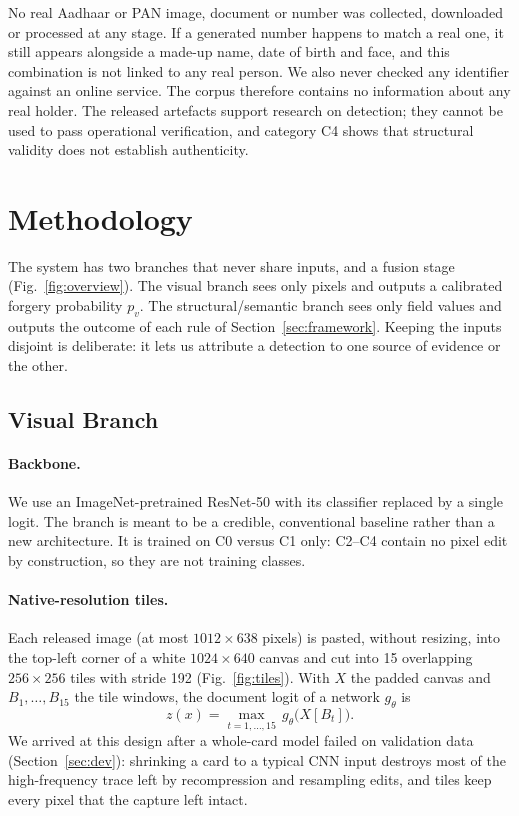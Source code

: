 \documentclass[VANCOUVER,Times1COL]{WileyNJDv5}
\begin{document}
No real Aadhaar or PAN image, document or number was collected,
downloaded or processed at any stage. If a generated number happens to match a real one, it still appears alongside a made-up name, date of birth and face, and this combination is not linked to any real person. We also never checked any identifier against an online service. The corpus therefore
contains no information about any real holder. The released artefacts
support research on detection; they cannot be used to pass operational
verification, and category C4 shows that structural validity does not
establish authenticity.

\section{Methodology}
\label{sec:method}

The system has two branches that never share inputs, and a fusion stage
(Fig.~\ref{fig:overview}). The visual branch sees only pixels and
outputs a calibrated forgery probability $p_v$. The
structural/semantic branch sees only field values and outputs the
outcome of each rule of Section~\ref{sec:framework}. Keeping the inputs
disjoint is deliberate: it lets us attribute a detection to one
source of evidence or the other.

\subsection{Visual Branch}
\label{sec:visual}

\paragraph*{Backbone.} We use an ImageNet-pretrained\cite{imagenet}
ResNet-50\cite{resnet} with its classifier replaced by a single logit.
The branch is meant to be a credible, conventional baseline rather than
a new architecture. It is trained on C0 versus C1 only: C2--C4 contain
no pixel edit by construction, so they are not training classes.

\paragraph*{Native-resolution tiles.} Each released image (at most
$1012{\times}638$ pixels) is pasted, without resizing, into the top-left
corner of a white $1024{\times}640$ canvas and cut into 15 overlapping
$256{\times}256$ tiles with stride 192 (Fig.~\ref{fig:tiles}). With
$X$ the padded canvas and $B_1,\dots,B_{15}$ the tile windows, the
document logit of a network $g_\theta$ is
\begin{equation}
\label{eq:maxtile}
z(x)=\max_{t=1,\dots,15}\, g_\theta\big(X[B_t]\big).
\end{equation}
We arrived at this design
after a whole-card model failed on validation data
(Section~\ref{sec:dev}): shrinking a card to a typical CNN input
destroys most of the high-frequency trace left by recompression and
resampling edits, and tiles keep every pixel that the capture left
intact.
\end{document}
